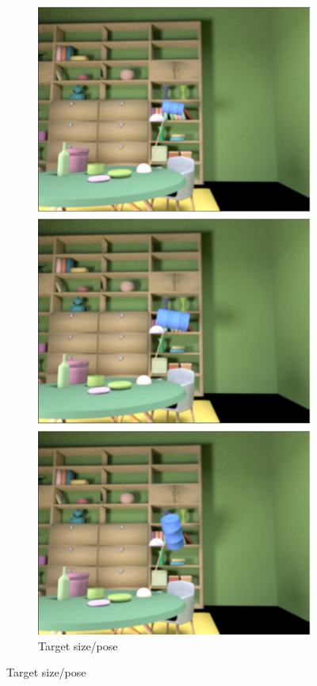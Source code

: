 \documentclass{jov}
\begin{document}
\begin{figure}
\begin{subfigure}{0.18 \textwidth}
        \label{fig:targetPositionVariation}
    \end{subfigure}
    ~
	\begin{subfigure}{0.18 \textwidth}
    \centering
        \caption{Target size/pose}
        \includegraphics[width=\textwidth]{../FiguresDraft5/Figure4/Figure4_b.pdf}

\end{subfigure}
\end{figure}
\end{document}
